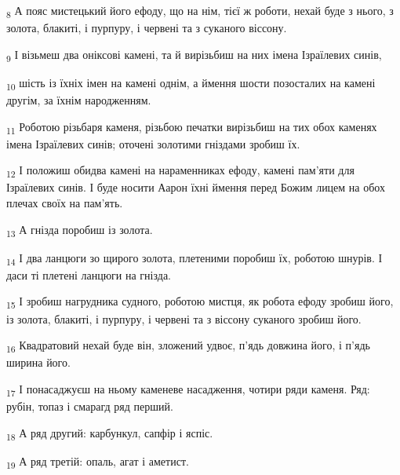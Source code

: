\begin{tcolorbox}
\textsubscript{8} А пояс мистецький його ефоду, що на нім, тієї ж роботи, нехай буде з нього, з золота, блакиті, і пурпуру, і червені та з суканого віссону.
\end{tcolorbox}
\begin{tcolorbox}
\textsubscript{9} І візьмеш два оніксові камені, та й вирізьбиш на них імена Ізраїлевих синів,
\end{tcolorbox}
\begin{tcolorbox}
\textsubscript{10} шість із їхніх імен на камені однім, а ймення шости позосталих на камені другім, за їхнім народженням.
\end{tcolorbox}
\begin{tcolorbox}
\textsubscript{11} Роботою різьбаря каменя, різьбою печатки вирізьбиш на тих обох каменях імена Ізраїлевих синів; оточені золотими гніздами зробиш їх.
\end{tcolorbox}
\begin{tcolorbox}
\textsubscript{12} І положиш обидва камені на нараменниках ефоду, камені пам'яти для Ізраїлевих синів. І буде носити Аарон їхні ймення перед Божим лицем на обох плечах своїх на пам'ять.
\end{tcolorbox}
\begin{tcolorbox}
\textsubscript{13} А гнізда поробиш із золота.
\end{tcolorbox}
\begin{tcolorbox}
\textsubscript{14} І два ланцюги зо щирого золота, плетеними поробиш їх, роботою шнурів. І даси ті плетені ланцюги на гнізда.
\end{tcolorbox}
\begin{tcolorbox}
\textsubscript{15} І зробиш нагрудника судного, роботою мистця, як робота ефоду зробиш його, із золота, блакиті, і пурпуру, і червені та з віссону суканого зробиш його.
\end{tcolorbox}
\begin{tcolorbox}
\textsubscript{16} Квадратовий нехай буде він, зложений удвоє, п'ядь довжина його, і п'ядь ширина його.
\end{tcolorbox}
\begin{tcolorbox}
\textsubscript{17} І понасаджуєш на ньому каменеве насадження, чотири ряди каменя. Ряд: рубін, топаз і смарагд ряд перший.
\end{tcolorbox}
\begin{tcolorbox}
\textsubscript{18} А ряд другий: карбункул, сапфір і яспіс.
\end{tcolorbox}
\begin{tcolorbox}
\textsubscript{19} А ряд третій: опаль, агат і аметист.
\end{tcolorbox}
